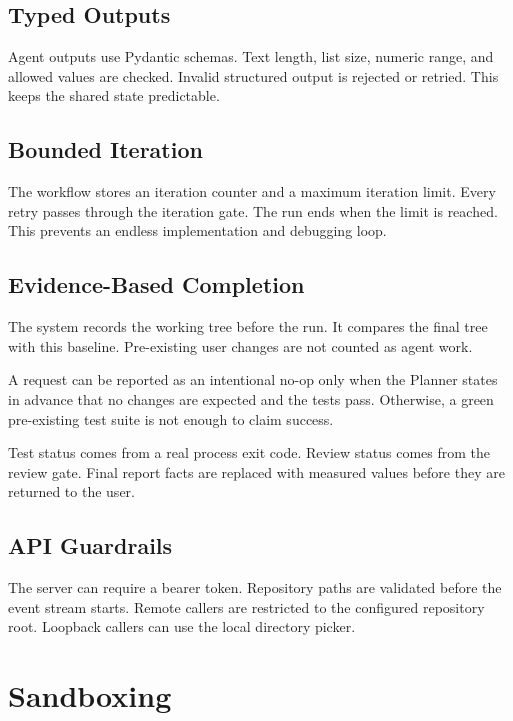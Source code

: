 \documentclass[11pt,a4paper]{article}
\begin{document}
\subsection{Typed Outputs}

Agent outputs use Pydantic schemas. Text length, list size, numeric range, and
allowed values are checked. Invalid structured output is rejected or retried.
This keeps the shared state predictable.

\subsection{Bounded Iteration}

The workflow stores an iteration counter and a maximum iteration limit. Every
retry passes through the iteration gate. The run ends when the limit is
reached. This prevents an endless implementation and debugging loop.

\subsection{Evidence-Based Completion}

The system records the working tree before the run. It compares the final tree
with this baseline. Pre-existing user changes are not counted as agent work.

A request can be reported as an intentional no-op only when the Planner states
in advance that no changes are expected and the tests pass. Otherwise, a green
pre-existing test suite is not enough to claim success.

Test status comes from a real process exit code. Review status comes from the
review gate. Final report facts are replaced with measured values before they
are returned to the user.

\subsection{API Guardrails}

The server can require a bearer token. Repository paths are validated before
the event stream starts. Remote callers are restricted to the configured
repository root. Loopback callers can use the local directory picker.

\section{Sandboxing}
\end{document}
